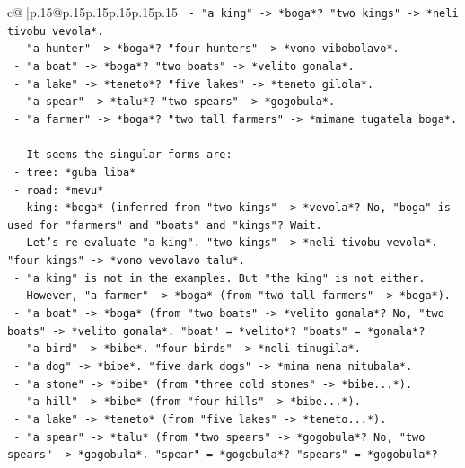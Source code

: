 \documentclass{article}
\begin{document}
{\begin{supertabular}{c@{$\;$}|p{.15\linewidth}@{}p{.15\linewidth}p{.15\linewidth}p{.15\linewidth}p{.15\linewidth}p{.15\linewidth}}
{{{\texttt{            {-} "a king" {-}> *boga*? "two kings" {-}> *neli tivobu vevola*.} \\
\texttt{            {-} "a hunter" {-}> *boga*? "four hunters" {-}> *vono vibobolavo*.} \\
\texttt{            {-} "a boat" {-}> *boga*? "two boats" {-}> *velito gonala*.} \\
\texttt{            {-} "a lake" {-}> *teneto*? "five lakes" {-}> *teneto gilola*.} \\
\texttt{            {-} "a spear" {-}> *talu*? "two spears" {-}> *gogobula*.} \\
\texttt{            {-} "a farmer" {-}> *boga*? "two tall farmers" {-}> *mimane tugatela boga*.} \\
\\ 
\texttt{    {-} It seems the singular forms are:} \\
\texttt{      {-} tree: *guba liba*} \\
\texttt{      {-} road: *mevu*} \\
\texttt{      {-} king: *boga* (inferred from "two kings" {-}> *vevola*? No, "boga" is used for "farmers" and "boats" and "kings"? Wait.} \\
\texttt{      {-} Let's re{-}evaluate "a king". "two kings" {-}> *neli tivobu vevola*. "four kings" {-}> *vono vevolavo talu*.} \\
\texttt{      {-} "a king" is not in the examples. But "the king" is not either.} \\
\texttt{      {-} However, "a farmer" {-}> *boga* (from "two tall farmers" {-}> *boga*).} \\
\texttt{      {-} "a boat" {-}> *boga* (from "two boats" {-}> *velito gonala*? No, "two boats" {-}> *velito gonala*. "boat" = *velito*? "boats" = *gonala*?} \\
\texttt{      {-} "a bird" {-}> *bibe*. "four birds" {-}> *neli tinugila*.} \\
\texttt{      {-} "a dog" {-}> *bibe*. "five dark dogs" {-}> *mina nena nitubala*.} \\
\texttt{      {-} "a stone" {-}> *bibe* (from "three cold stones" {-}> *bibe...*).} \\
\texttt{      {-} "a hill" {-}> *bibe* (from "four hills" {-}> *bibe...*).} \\
\texttt{      {-} "a lake" {-}> *teneto* (from "five lakes" {-}> *teneto...*).} \\
\texttt{      {-} "a spear" {-}> *talu* (from "two spears" {-}> *gogobula*? No, "two spears" {-}> *gogobula*. "spear" = *gogobula*? "spears" = *gogobula*?} \\
}}}
\end{supertabular}}
\end{document}
